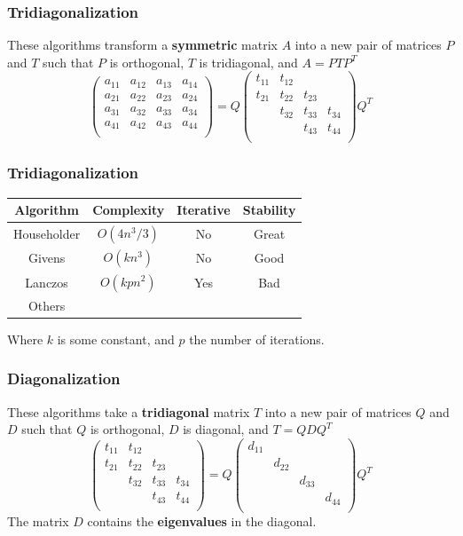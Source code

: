\documentclass[serif, 12pt]{beamer}
\newcommand*\mat[1]{ \begin{pmatrix} #1 \end{pmatrix}}
\begin{document}

\begin{frame}
%
\frametitle{Tridiagonalization}
%
These algorithms transform a \textbf{symmetric} matrix $A$ into a new pair of 
matrices $P$ and $T$ such that $P$ is orthogonal, $T$ is tridiagonal, and $A = 
PTP^T$
%
$$
	\mat{
		a_{11} & a_{12} & a_{13} & a_{14} \\
		a_{21} & a_{22} & a_{23} & a_{24} \\
		a_{31} & a_{32} & a_{33} & a_{34} \\
		a_{41} & a_{42} & a_{43} & a_{44} \\
	} =
	Q
	\mat{
		t_{11} & t_{12} &        &        \\
		t_{21} & t_{22} & t_{23} &        \\
		       & t_{32} & t_{33} & t_{34} \\
		       &        & t_{43} & t_{44} \\
	}
	Q^T
$$
%
\end{frame}


\begin{frame}
%
\frametitle{Tridiagonalization}
%
\begin{center}
\begin{tabular}{c c c c}
	\toprule
	Algorithm 		& Complexity  & Iterative & Stability\\
	\midrule
	Householder		& $O(4n^3/3)$ & No        & Great\\
	Givens				& $O(kn^3)$   & No        & Good \\
	Lanczos				& $O(kpn^2)$  & Yes       & Bad \\
	Others				&             &          \\
	\bottomrule
\end{tabular}
\end{center}
Where $k$ is some constant, and $p$ the number of iterations.
\end{frame}


\begin{frame}
%
\frametitle{Diagonalization}
%
These algorithms take a \textbf{tridiagonal} matrix $T$ into a new pair of 
matrices $Q$ and $D$ such that $Q$ is orthogonal, $D$ is diagonal, and $T = 
QDQ^T$
%
$$
	\mat{
		t_{11} & t_{12} &        &        \\
		t_{21} & t_{22} & t_{23} &        \\
		       & t_{32} & t_{33} & t_{34} \\
		       &        & t_{43} & t_{44} \\
	}=
	Q
	\mat{
		d_{11} &        &        &        \\
		       & d_{22} &        &        \\
		       &        & d_{33} &        \\
		       &        &        & d_{44} \\
	}
	Q^T
$$
%
The matrix $D$ contains the \textbf{eigenvalues} in the diagonal.
\end{frame}
\end{document}
